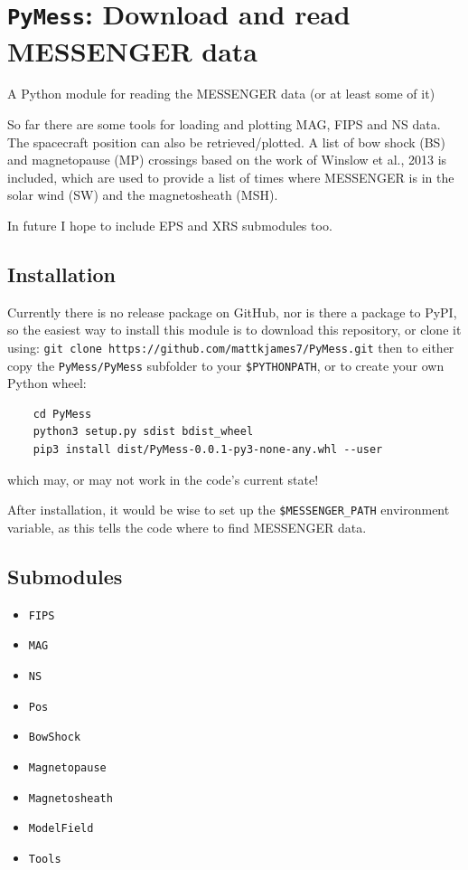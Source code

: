	\section{\texttt{PyMess}: Download and read MESSENGER data}

	A Python module for reading the MESSENGER data (or at least some of it)
	
	So far there are some tools for loading and plotting MAG, FIPS and NS data. The 
	spacecraft position can also be retrieved/plotted. A list of bow shock (BS) and
	magnetopause (MP) crossings based on the work of Winslow et al., 2013 is 
	included, which are used to provide a list of times where MESSENGER is in the 
	solar wind (SW) and the magnetosheath (MSH).
	
	In future I hope to include EPS and XRS submodules too.
	
	\subsection{Installation}
	
	Currently there is no release package on GitHub, nor is there a package 
	to PyPI, so the easiest way to install this module is to download this 
	repository, or clone it using:
	\texttt{git clone https://github.com/mattkjames7/PyMess.git}
	then to either copy the \texttt{PyMess/PyMess} subfolder to your \texttt{\$PYTHONPATH}, or 
	to create your own Python wheel:
	\begin{verbatim}
	cd PyMess
	python3 setup.py sdist bdist_wheel
	pip3 install dist/PyMess-0.0.1-py3-none-any.whl --user
	\end{verbatim}
	which may, or may not work in the code's current state!
	
	After installation, it would be wise to set up the \texttt{\$MESSENGER\_PATH}
	environment variable, as this tells the code where to find MESSENGER
	data.
	
	
	\subsection{Submodules}
	\begin{itemize}
		\item \texttt{FIPS}
		\item \texttt{MAG}
		\item \texttt{NS}
		\item \texttt{Pos}
		\item \texttt{BowShock}
		\item \texttt{Magnetopause}
		\item \texttt{Magnetosheath}
		\item \texttt{ModelField}
		\item \texttt{Tools}
	\end{itemize}
	
